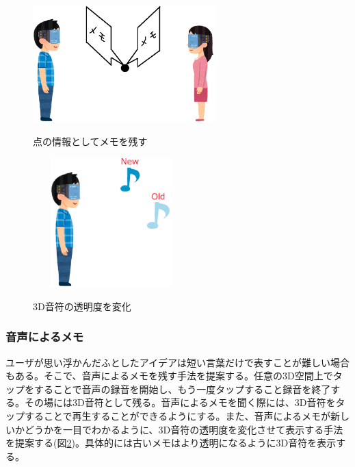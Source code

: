 \documentclass{hissymp}
\begin{document}
\begin{figure}[h]
  \begin{center}
    \includegraphics[clip,width=7.0cm]{./tennomemo.eps}
    \caption{点の情報としてメモを残す}
    \label{fig:tennomemo}
  \end{center}
\end{figure}

\begin{figure}[h]
  \begin{center}
    \includegraphics[clip,height=5.0cm,width=6.0cm]{./onpu_memo.eps}
    \caption{3D音符の透明度を変化}
    \label{fig:onpu_memo}
  \end{center}
\end{figure}

\subsubsection{音声によるメモ}
ユーザが思い浮かんだふとしたアイデアは短い言葉だけで表すことが難しい場合もある。そこで、音声によるメモを残す手法を提案する。任意の3D空間上でタップをすることで音声の録音を開始し、もう一度タップすること録音を終了する。その場には3D音符として残る。音声によるメモを聞く際には、3D音符をタップすることで再生することができるようにする。また、音声によるメモが新しいかどうかを一目でわかるように、3D音符の透明度を変化させて表示する手法を提案する(図\ref{fig:onpu_memo})。具体的には古いメモはより透明になるように3D音符を表示する。
\end{document}
